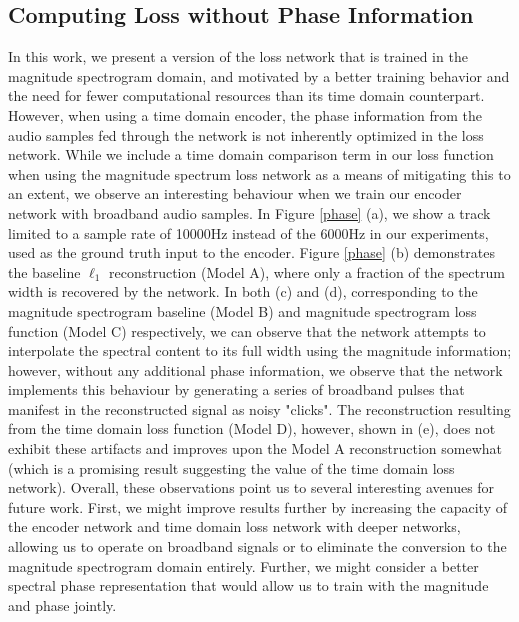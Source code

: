 \documentclass[sigconf]{acmart}
\begin{document}
\subsection{Computing Loss without Phase Information}
In this work, we present a version of the loss network that is trained in the magnitude spectrogram domain, and motivated by a better training behavior and the need for fewer computational resources than its time domain counterpart.  However, when using a time domain encoder, the phase information from the audio samples fed through the network is not inherently optimized in the loss network.  While we include a time domain comparison term in our loss function when using the magnitude spectrum loss network as a means of mitigating this to an extent, we observe an interesting behaviour when we train our encoder network with broadband audio samples.  In Figure \ref{phase} (a), we show a track limited to a sample rate of 10000Hz instead of the 6000Hz in our experiments, used as the ground truth input to the encoder. Figure \ref{phase} (b) demonstrates the baseline $\ell_{1}$ reconstruction (Model A), where only a fraction of the spectrum width is recovered by the network. In both (c) and (d), corresponding to the magnitude spectrogram baseline (Model B) and magnitude spectrogram loss function (Model C) respectively, we can observe that the network attempts to interpolate the spectral content to its full width using the magnitude information; however, without any additional phase information, we observe that the network implements this behaviour by generating a series of broadband pulses that manifest in the reconstructed signal as noisy "clicks".  The reconstruction resulting from the time domain loss function (Model D), however, shown in (e), does not exhibit these artifacts and improves upon the Model A reconstruction somewhat (which is a promising result suggesting the value of the time domain loss network).  Overall, these observations point us to several interesting avenues for future work. First, we might improve results further by increasing the capacity of the encoder network and time domain loss network with deeper networks, allowing us to operate on broadband signals or to eliminate the conversion to the magnitude spectrogram domain entirely. Further, we might consider a better spectral phase representation that would allow us to train with the magnitude and phase jointly. 
\end{document}
